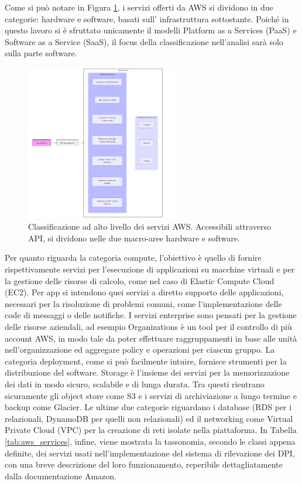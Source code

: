 Come si può notare in Figura \ref{fig:services_taxonomy}, i servizi offerti da AWS si dividono in due categorie: hardware e software, basati sull' infrastruttura sottostante\cite{a12AWSinAction}. Poiché in questo lavoro si è sfruttato unicamente il modelli Platform as a Services (PaaS) e Software as a Service (SaaS), 
il focus della classificazione nell'analisi sarà solo sulla parte software.
\begin{figure}[htbp]
    \centering
    \includegraphics[width=0.59\textwidth]{figures/aws_services_taxonomy.png}
    \caption{Classificazione ad alto livello dei servizi AWS. Accessibili attraverso API, si dividono nelle due macro-aree hardware e software.}
    \label{fig:services_taxonomy}
\end{figure}

Per quanto riguarda la categoria compute, l'obiettivo è quello di fornire rispettivamente servizi per l'esecuzione di applicazioni su macchine virtuali e per la gestione delle risorse di calcolo, come nel caso di Elastic Compute Cloud (EC2). Per app si intendono quei servizi a diretto supporto delle applicazioni, necessari per la risoluzione di problemi comuni, come l'implementazione delle code di messaggi o delle notifiche. I servizi enterprise sono pensati per la gestione delle risorse aziendali, ad esempio Organizations è un tool per il controllo di più account AWS, in modo tale da poter effettuare raggruppamenti in base alle unità nell'organizzazione ed aggregare policy e operazioni per ciascun gruppo. La categoria deployment, come si può facilmente intuire, fornisce strumenti per la distribuzione del software. Storage è l'insieme dei servizi per la memorizzazione dei dati in modo sicuro, scalabile e di lunga durata. Tra questi rientrano sicuramente gli object store come S3 e i servizi di archiviazione a lungo termine e backup come Glacier. Le ultime due categorie riguardano i database (RDS per i relazionali, DynamoDB per quelli non relazionali) ed il networking come Virtual Private Cloud (VPC) per la creazione di reti isolate nella piattaforma. %
In Tabella \ref{tab:aws_services}, infine, viene mostrata la tassonomia, secondo le classi appena definite, dei servizi usati nell'implementazione del sistema di rilevazione dei DPI, con una breve descrizione del loro funzionamento, reperibile dettagliatamente dalla documentazione Amazon\cite{a13AWSDoc}. 

